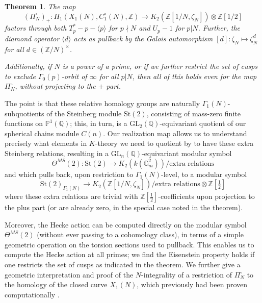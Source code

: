\documentclass[10pt]{amsart}
\newtheorem{thm}{Theorem}[section]
\theoremstyle{definition}
\newcommand{\Z}{\mathbb{Z}}
\newcommand{\Q}{\mathbb{Q}}
\newcommand{\St}{\mathrm{St}}
\newcommand{\G}{\mathbb{G}}
\renewcommand{\P}{\mathbb{P}}
\newcommand{\GL}{\mathrm{GL}}
\numberwithin{equation}{section}
\begin{document}
    \begin{thm} \label{thm:sharifi}
        The map
        \[
        (\Pi_N^\circ)_+: H_1(X_1(N),C_1^\circ(N),\Z) \to K_2(\Z[1/N,\zeta_N]) \otimes \Z[1/2]
        \]
        factors through both $T_p^* - p-\langle p\rangle$ for $p \nmid N$ and $U_p-1$ for $p|N$. Further, the diamond operator $\langle d \rangle$ acts as pullback by the Galois automorphism $[d]:\zeta_N\mapsto \zeta_N^d$ for all $d\in (\Z/N)^\times$. 

        Additionally, if $N$ is a power of a prime, or if we further restrict the set of cusps to exclude $\Gamma_0(p)$-orbit of $\infty$ for \emph{all} $p|N$, then all of this holds even for the map $\Pi_N^\circ$, \emph{without} projecting to the $+$ part. 
    \end{thm}

    The point is that these relative homology groups are naturally $\Gamma_1(N)$-subquotients of the Steinberg module $\St(2)$, consisting of mass-zero finite functions on $\P^1(\Q)$; this, in turn, is a $\GL_2(\Q)$-equivariant quotient of our spherical chains module $C(n)$. Our realization map allows us to understand precisely what elements in $K$-theory we need to quotient by to have these extra Steinberg relations, resulting in a $\GL_n(\Q)$-equivariant modular symbol 
    \[
    \Theta^{MS}(2):\St(2)\to K_2(k(\G_m^2))/\text{extra relations}
    \]
    and which pulls back, upon restriction to $\Gamma_1(N)$-level, to a modular symbol
    \[
    \St(2)_{\Gamma_1(N)} \to K_2(\Z[1/N,\zeta_N])/\text{extra relations} \otimes \Z[\tfrac{1}{2}]
    \]
    where these extra relations are trivial with $\Z[\frac{1}{2}]$-coefficients upon projection to the plus part (or are already zero, in the special case noted in the theorem).
    
    Moreover, the Hecke action can be computed directly on the modular symbol $\Theta^{MS}(2)$ (without ever passing to a cohomology class), in terms of a simple geometric operation on the torsion sections used to pullback. This enables us to compute the Hecke action at all primes; we find the Eisenstein property holds if one restricts the set of cusps as indicated in the theorem. We further give a geometric interpretation and proof of the $N$-integrality of a restriction of $\Pi_N^\circ$ to the homology of the closed curve $X_1(N)$, which previously had been proven computationally \cite[Lemma 4.2.7]{SV} \cite[Lemma 3.3.11]{FK}. 
\end{document}
